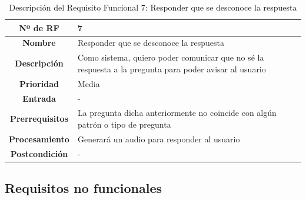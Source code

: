 \begin{table}[H]
	\centering
	\begin{tabularx}{\textwidth}{|c|X|} 
		\hline
		\textbf{Nº de RF }          &  7 \\ 
		\hline
		\textbf{Nombre}         &  Responder que se desconoce la respuesta  \\ 
		\hline
		\textbf{Descripción}    &  Como sistema, quiero poder comunicar que no sé la respuesta a la pregunta para poder avisar al usuario \\ 
		\hline
		\textbf{Prioridad}      &  Media  \\ 
		\hline
		\textbf{Entrada}        & -  \\ 
		\hline
		\textbf{Prerrequisitos} & La pregunta dicha anteriormente no coincide con algún patrón o tipo de pregunta \\ 
		\hline
		\textbf{Procesamiento}  &  Generará un audio para responder al usuario \\ 
		\hline
		\textbf{Postcondición}  &  - \\
		\hline
	\end{tabularx}
	\caption{Descripción del Requisito Funcional 7: Responder que se desconoce la respuesta}
\end{table}

\subsection{Requisitos no funcionales}

